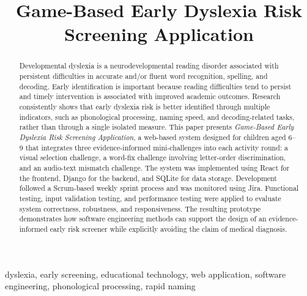 \documentclass[conference]{IEEEtran}
\begin{document}
\title{Game-Based Early Dyslexia Risk Screening Application}

\author{
}

\maketitle

\begin{abstract}
Developmental dyslexia is a neurodevelopmental reading disorder associated with persistent difficulties in accurate and/or fluent word recognition, spelling, and decoding. Early identification is important because reading difficulties tend to persist and timely intervention is associated with improved academic outcomes. Research consistently shows that early dyslexia risk is better identified through multiple indicators, such as phonological processing, naming speed, and decoding-related tasks, rather than through a single isolated measure. This paper presents \textit{Game-Based Early Dyslexia Risk Screening Application}, a web-based system designed for children aged 6--9 that integrates three evidence-informed mini-challenges into each activity round: a visual selection challenge, a word-fix challenge involving letter-order discrimination, and an audio-text mismatch challenge. The system was implemented using React for the frontend, Django for the backend, and SQLite for data storage. Development followed a Scrum-based weekly sprint process and was monitored using Jira. Functional testing, input validation testing, and performance testing were applied to evaluate system correctness, robustness, and responsiveness. The resulting prototype demonstrates how software engineering methods can support the design of an evidence-informed early risk screener while explicitly avoiding the claim of medical diagnosis.
\end{abstract}

\begin{IEEEkeywords}
dyslexia, early screening, educational technology, web application, software engineering, phonological processing, rapid naming
\end{IEEEkeywords}
\end{document}
